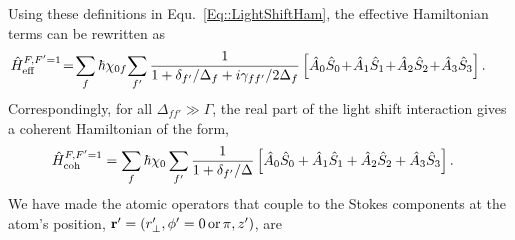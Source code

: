 \documentclass[preprint,aps,pra,onecolumn]{revtex4-1} %
\begin{document}
Using these definitions in Equ.~\eqref{Eq::LightShiftHam}, the effective Hamiltonian terms can be rewritten as
\begin{align}
\!\!\!\! \hat{H}_{\rm eff}^{F,F'=1} &\!=\! \sum_{f} \hbar \chi_{0f}\! \sum_{f'}\frac{1}{1+\delta_{f'}/\Delta_f+i\gamma_{ff'}/2\Delta_f}\left[\hat{A}_0\hat{S}_0 \!+\! \hat{A}_1\hat{S}_1 \!+\! \hat{A}_2\hat{S}_2 \!+\!\hat{A}_3\hat{S}_3 \right]. 
\end{align}
Correspondingly, for all $\Delta_{ff'}\gg \Gamma$, the real part of the light shift interaction gives a coherent Hamiltonian of the form,
\begin{align} \label{Eq::StokesHam}
	\hat{H}_{\rm coh}^{F,F'=1} &= \sum_f \hbar \chi_0 \sum_{f'} \frac{1}{1+ \delta_{f'}/\Delta} \left[\hat{A}_0\hat{S}_0 +\hat{A}_1\hat{S}_1 +\hat{A}_2\hat{S}_2 +\hat{A}_3\hat{S}_3 \right]. 
\end{align}
We have made the atomic operators that couple to the Stokes components at the atom's position, $\mathbf{r}'=(r_\perp^\prime,\phi'=0\,\mathrm{or}\, \pi, z')$, are
\end{document}
